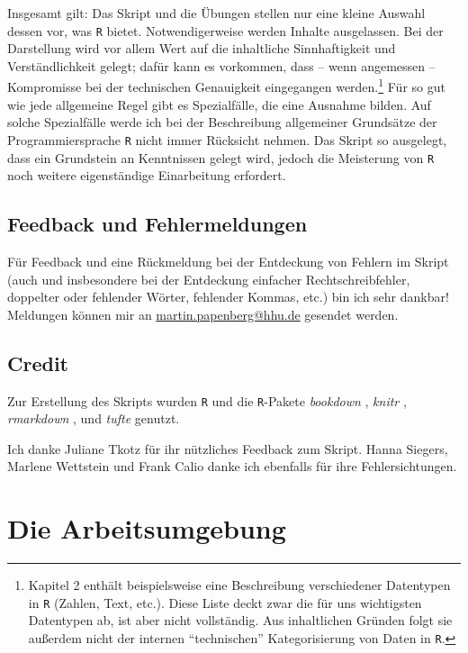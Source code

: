 \documentclass[12pt,]{tufte-book}
\theoremstyle{definition}
\theoremstyle{definition}
\theoremstyle{definition}
\theoremstyle{remark}
\begin{document}
Insgesamt gilt: Das Skript und die Übungen stellen nur eine kleine
Auswahl dessen vor, was \texttt{R} bietet. Notwendigerweise werden
Inhalte ausgelassen. Bei der Darstellung wird vor allem Wert auf die
inhaltliche Sinnhaftigkeit und Verständlichkeit gelegt; dafür kann es
vorkommen, dass -- wenn angemessen -- Kompromisse bei der technischen
Genauigkeit eingegangen werden.\footnote{Kapitel 2 enthält
  beispielsweise eine Beschreibung verschiedener Datentypen in
  \texttt{R} (Zahlen, Text, etc.). Diese Liste deckt zwar die für uns
  wichtigsten Datentypen ab, ist aber nicht vollständig. Aus
  inhaltlichen Gründen folgt sie außerdem nicht der internen
  ``technischen'' Kategorisierung von Daten in \texttt{R}.} Für so gut
wie jede allgemeine Regel gibt es Spezialfälle, die eine Ausnahme
bilden. Auf solche Spezialfälle werde ich bei der Beschreibung
allgemeiner Grundsätze der Programmiersprache \texttt{R} nicht immer
Rücksicht nehmen. Das Skript so ausgelegt, dass ein Grundstein an
Kenntnissen gelegt wird, jedoch die Meisterung von \texttt{R} noch
weitere eigenständige Einarbeitung erfordert.

\subsection{Feedback und
Fehlermeldungen}\label{feedback-und-fehlermeldungen}

Für Feedback und eine Rückmeldung bei der Entdeckung von Fehlern im
Skript (auch und insbesondere bei der Entdeckung einfacher
Rechtschreibfehler, doppelter oder fehlender Wörter, fehlender Kommas,
etc.) bin ich sehr dankbar! Meldungen können mir an
\href{mailto:martin.papenberg@hhu.de}{martin.papenberg@hhu.de} gesendet
werden.

\subsection{Credit}\label{credit}

Zur Erstellung des Skripts wurden \texttt{R} \citep[3.4.4,][]{R-base}
und die \texttt{R}-Pakete \emph{bookdown} \citep[0.5,][]{R-bookdown},
\emph{knitr} \citep[1.18,][]{R-knitr}, \emph{rmarkdown}
\citep[1.8,][]{R-rmarkdown}, und \emph{tufte} \citep[0.2,][]{R-tufte}
genutzt.

Ich danke Juliane Tkotz für ihr nützliches Feedback zum Skript. Hanna
Siegers, Marlene Wettstein und Frank Calio danke ich ebenfalls für ihre
Fehlersichtungen.

\section{Die Arbeitsumgebung}\label{die-arbeitsumgebung}
\end{document}
